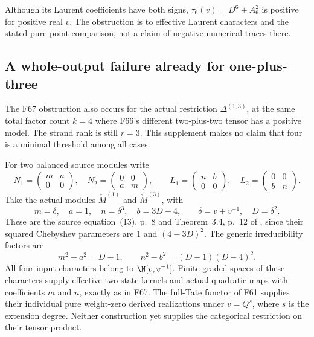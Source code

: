 \documentclass[11pt,a4paper]{article}
\newcommand{\fid}[1]{\textsf{#1}}\newcommand{\gate}[1]{\textsf{#1}}
\theoremstyle{named}\newtheorem{finding}{Finding}[section]
\theoremstyle{definition}\newtheorem{definition}[finding]{Definition}
\theoremstyle{remark}\newtheorem{remark}[finding]{Remark}
\begin{document}
Although its Laurent coefficients have both
signs, \(\tau_6(v)=D^6+A_6^2\) is positive
for positive real \(v\). The obstruction is
to effective Laurent characters and the
stated pure-point comparison, not a claim
of negative numerical traces there.

\subsection{A whole-output failure already for one-plus-three}

The \fid{F67} obstruction also occurs for the
actual restriction \(\Delta^{(1,3)}\), at the
same total factor count \(k=4\) where
\fid{F66}'s different two-plus-two tensor has
a positive model. The strand rank is still
\(r=3\). This supplement makes no claim that
four is a minimal threshold among all cases.

For two balanced source modules write
\[
 N_1=\begin{pmatrix}m&a\\0&0\end{pmatrix},\quad
 N_2=\begin{pmatrix}0&0\\a&m\end{pmatrix},\qquad
 L_1=\begin{pmatrix}n&b\\0&0\end{pmatrix},\quad
 L_2=\begin{pmatrix}0&0\\b&n\end{pmatrix}.
\]
Take the actual modules
\(\check M^{(1)}\) and \(\check M^{(3)}\), with
\begin{equation}\label{eq:oneThreeActualInputs}
 m=\delta,\quad a=1,\quad
 n=\delta^3,\quad b=3D-4,\qquad
 \delta=v+v^{-1},\quad D=\delta^2.
\end{equation}
These are the source equation~(13), p.~8
and Theorem~3.4, p.~12 of
\cite{BlasiakChebyshev}, since their squared
Chebyshev parameters are \(1\) and \((4-3D)^2\).
The generic irreducibility factors are
\[
        m^2-a^2=D-1,\qquad
        n^2-b^2=(D-1)(D-4)^2.
\]
All four input characters belong to
\(\N[v,v^{-1}]\). Finite graded spaces of
these characters supply effective two-state
kernels and actual quadratic maps with
coefficients \(m\) and \(n\), exactly as
in \fid{F67}. The full-Tate functor of
\fid{F61} supplies their individual pure
weight-zero derived realizations under
\(v=Q^s\), where \(s\) is the extension degree.
Neither construction yet supplies the
categorical restriction on their tensor product.
\end{document}

